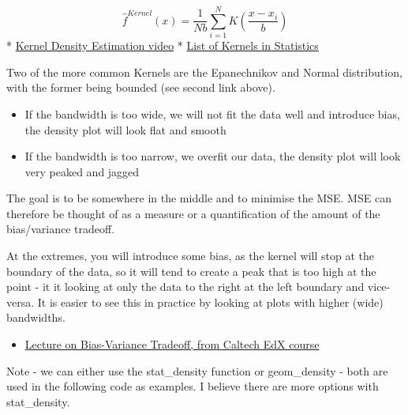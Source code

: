 \documentclass[]{book}
\providecommand{\tightlist}{%
  \setlength{\itemsep}{0pt}\setlength{\parskip}{0pt}}
\theoremstyle{definition}
\theoremstyle{definition}
\theoremstyle{definition}
\theoremstyle{remark}
\begin{document}
\[\hat{f} ^{Kernel} (x) = \left. {\frac{1}{Nb} \sum_{i=1}^{N} K (\frac{x - x_i}{b})} \right.\]
* \href{https://www.youtube.com/watch?v=gPWsDh59zdo}{Kernel Density
Estimation video} *
\href{https://en.wikipedia.org/wiki/Kernel_(statistics)}{List of Kernels
in Statistics}

Two of the more common Kernels are the Epanechnikov and Normal
distribution, with the former being bounded (see second link above).

\begin{itemize}
\tightlist
\item
  If the bandwidth is too wide, we will not fit the data well and
  introduce bias, the density plot will look flat and smooth
\item
  If the bandwidth is too narrow, we overfit our data, the density plot
  will look very peaked and jagged
\end{itemize}

The goal is to be somewhere in the middle and to minimise the MSE. MSE
can therefore be thought of as a measure or a quantification of the
amount of the bias/variance tradeoff.

At the extremes, you will introduce some bias, as the kernel will stop
at the boundary of the data, so it will tend to create a peak that is
too high at the point - it it looking at only the data to the right at
the left boundary and vice-versa. It is easier to see this in practice
by looking at plots with higher (wide) bandwidths.

\begin{itemize}
\tightlist
\item
  \href{https://www.youtube.com/watch?v=zrEyxfl2-a8}{Lecture on
  Bias-Variance Tradeoff, from Caltech EdX course}
\end{itemize}

Note - we can either use the stat\_density function or geom\_density -
both are used in the following code as examples. I believe there are
more options with stat\_density.
\end{document}
